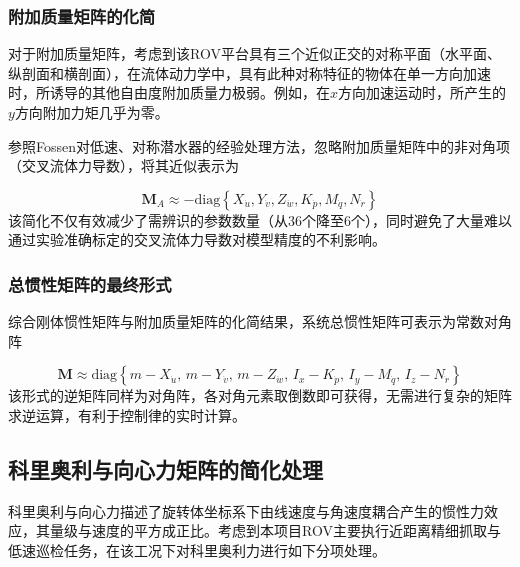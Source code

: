 \subsubsection{附加质量矩阵的化简}

对于附加质量矩阵，考虑到该ROV平台具有三个近似正交的对称平面（水平面、纵剖面和横剖面），在流体动力学中，具有此种对称特征的物体在单一方向加速时，所诱导的其他自由度附加质量力极弱。例如，在$x$方向加速运动时，所产生的$y$方向附加力矩几乎为零。

参照Fossen对低速、对称潜水器的经验处理方法\cite{fossen2011handbook}，忽略附加质量矩阵中的非对角项（交叉流体力导数），将其近似表示为


\begin{equation}
    \boldsymbol{M}_{A}\approx
    -\mathrm{diag}
    \left\{
        X_{\dot{u}},Y_{\dot{v}},Z_{\dot{w}},K_{\dot{p}},M_{\dot{q}},N_{\dot{r}}
    \right\}
\end{equation}
该简化不仅有效减少了需辨识的参数数量（从36个降至6个），同时避免了大量难以通过实验准确标定的交叉流体力导数对模型精度的不利影响。

\subsubsection{总惯性矩阵的最终形式}

综合刚体惯性矩阵与附加质量矩阵的化简结果，系统总惯性矩阵可表示为常数对角阵

\begin{equation}
    \boldsymbol{M}\approx
    \mathrm{diag}
    \left\{
        m-X_{\dot{u}},\,
        m-Y_{\dot{v}},\,
        m-Z_{\dot{w}},\,
        I_x-K_{\dot{p}},\,
        I_y-M_{\dot{q}},\,
        I_z-N_{\dot{r}}
    \right\}
    \label{eq:M_simplified}
\end{equation}
该形式的逆矩阵同样为对角阵，各对角元素取倒数即可获得，无需进行复杂的矩阵求逆运算，有利于控制律的实时计算。

\subsection{科里奥利与向心力矩阵的简化处理}

科里奥利与向心力描述了旋转体坐标系下由线速度与角速度耦合产生的惯性力效应，其量级与速度的平方成正比。考虑到本项目ROV主要执行近距离精细抓取与低速巡检任务，在该工况下对科里奥利力进行如下分项处理。

